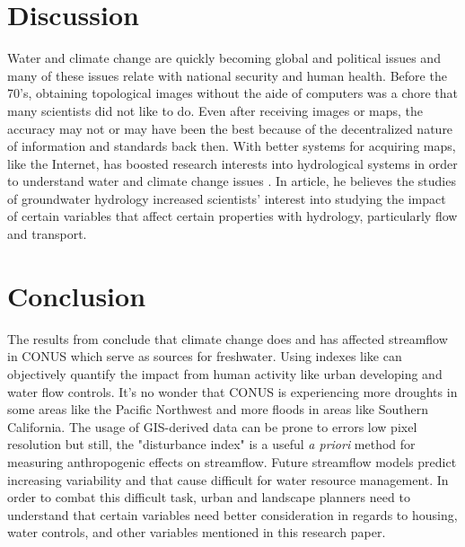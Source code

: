 \documentclass[a4paper,man,biblatex]{apa7}
\begin{document}
\section{Discussion} Water and climate change are quickly becoming global and political issues and many of these issues relate with national security and human health. Before the 70's, obtaining topological images without the aide of computers was a chore that many scientists did not like to do. Even after receiving images or maps, the accuracy may not or may have been the best because of the decentralized nature of information and standards back then. With better systems for acquiring maps, like the Internet, has boosted research interests into hydrological systems in order to understand water and climate change issues \autocite{bras_1999}. In \textcite{bras_1999} article, he believes the studies of groundwater hydrology increased scientists' interest into studying the impact of certain variables that affect certain properties with hydrology, particularly flow and transport.\\
\section{Conclusion} The results from \textcite{rice_2016} conclude that climate change does and has affected streamflow in CONUS which serve as sources for freshwater. Using indexes like \textcite{falcone_2016} can objectively quantify the impact from human activity like urban developing and water flow controls. It's no wonder that CONUS is experiencing more droughts in some areas like the Pacific Northwest and more floods in areas like Southern California. The usage of GIS-derived data can be prone to errors low pixel resolution but still, the "disturbance index" is a useful \textit{a priori} method for measuring anthropogenic effects on streamflow. Future streamflow models predict increasing variability and that cause difficult for water resource management. In order to combat this difficult task, urban and landscape planners need to understand that certain variables need better consideration in regards to housing, water controls, and other variables mentioned in this research paper. \\
\printbibliography
\end{document}
